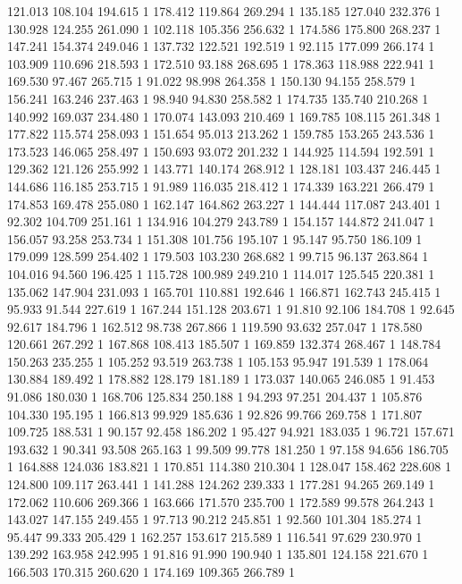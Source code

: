 	121.013	108.104	194.615	1
	178.412	119.864	269.294	1
	135.185	127.040	232.376	1
	130.928	124.255	261.090	1
	102.118	105.356	256.632	1
	174.586	175.800	268.237	1
	147.241	154.374	249.046	1
	137.732	122.521	192.519	1
	92.115	177.099	266.174	1
	103.909	110.696	218.593	1
	172.510	93.188	268.695	1
	178.363	118.988	222.941	1
	169.530	97.467	265.715	1
	91.022	98.998	264.358	1
	150.130	94.155	258.579	1
	156.241	163.246	237.463	1
	98.940	94.830	258.582	1
	174.735	135.740	210.268	1
	140.992	169.037	234.480	1
	170.074	143.093	210.469	1
	169.785	108.115	261.348	1
	177.822	115.574	258.093	1
	151.654	95.013	213.262	1
	159.785	153.265	243.536	1
	173.523	146.065	258.497	1
	150.693	93.072	201.232	1
	144.925	114.594	192.591	1
	129.362	121.126	255.992	1
	143.771	140.174	268.912	1
	128.181	103.437	246.445	1
	144.686	116.185	253.715	1
	91.989	116.035	218.412	1
	174.339	163.221	266.479	1
	174.853	169.478	255.080	1
	162.147	164.862	263.227	1
	144.444	117.087	243.401	1
	92.302	104.709	251.161	1
	134.916	104.279	243.789	1
	154.157	144.872	241.047	1
	156.057	93.258	253.734	1
	151.308	101.756	195.107	1
	95.147	95.750	186.109	1
	179.099	128.599	254.402	1
	179.503	103.230	268.682	1
	99.715	96.137	263.864	1
	104.016	94.560	196.425	1
	115.728	100.989	249.210	1
	114.017	125.545	220.381	1
	135.062	147.904	231.093	1
	165.701	110.881	192.646	1
	166.871	162.743	245.415	1
	95.933	91.544	227.619	1
	167.244	151.128	203.671	1
	91.810	92.106	184.708	1
	92.645	92.617	184.796	1
	162.512	98.738	267.866	1
	119.590	93.632	257.047	1
	178.580	120.661	267.292	1
	167.868	108.413	185.507	1
	169.859	132.374	268.467	1
	148.784	150.263	235.255	1
	105.252	93.519	263.738	1
	105.153	95.947	191.539	1
	178.064	130.884	189.492	1
	178.882	128.179	181.189	1
	173.037	140.065	246.085	1
	91.453	91.086	180.030	1
	168.706	125.834	250.188	1
	94.293	97.251	204.437	1
	105.876	104.330	195.195	1
	166.813	99.929	185.636	1
	92.826	99.766	269.758	1
	171.807	109.725	188.531	1
	90.157	92.458	186.202	1
	95.427	94.921	183.035	1
	96.721	157.671	193.632	1
	90.341	93.508	265.163	1
	99.509	99.778	181.250	1
	97.158	94.656	186.705	1
	164.888	124.036	183.821	1
	170.851	114.380	210.304	1
	128.047	158.462	228.608	1
	124.800	109.117	263.441	1
	141.288	124.262	239.333	1
	177.281	94.265	269.149	1
	172.062	110.606	269.366	1
	163.666	171.570	235.700	1
	172.589	99.578	264.243	1
	143.027	147.155	249.455	1
	97.713	90.212	245.851	1
	92.560	101.304	185.274	1
	95.447	99.333	205.429	1
	162.257	153.617	215.589	1
	116.541	97.629	230.970	1
	139.292	163.958	242.995	1
	91.816	91.990	190.940	1
	135.801	124.158	221.670	1
	166.503	170.315	260.620	1
	174.169	109.365	266.789	1
